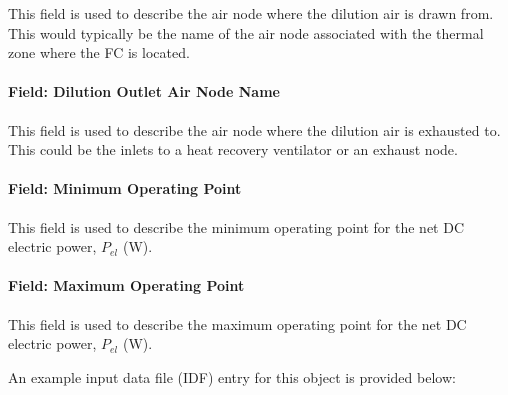 This field is used to describe the air node where the dilution air is drawn from. This would typically be the name of the air node associated with the thermal zone where the FC is located.

\paragraph{Field: Dilution Outlet Air Node Name}\label{field-dilution-outlet-air-node-name}

This field is used to describe the air node where the dilution air is exhausted to. This could be the inlets to a heat recovery ventilator or an exhaust node.

\paragraph{Field: Minimum Operating Point}\label{field-minimum-operating-point}

This field is used to describe the minimum operating point for the net DC electric power, \({P_{el}}\) (W).

\paragraph{Field: Maximum Operating Point}\label{field-maximum-operating-point}

This field is used to describe the maximum operating point for the net DC electric power, \({P_{el}}\) (W).

An example input data file (IDF) entry for this object is provided below:

